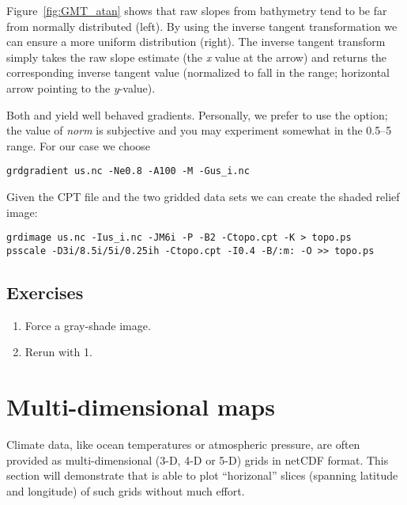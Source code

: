 \documentclass[11pt]{report}
\begin{document}
Figure~\ref{fig:GMT_atan} shows that raw slopes from bathymetry tend to be
far from normally distributed (left).  By using the inverse tangent
transformation we can ensure a more uniform distribution (right).
The inverse tangent transform simply takes the raw slope estimate
(the \emph{x} value at the arrow) and returns the corresponding inverse
tangent value (normalized to fall in the  range; horizontal
arrow pointing to the \emph{y}-value).


Both  and  yield well behaved gradients.  Personally,
we prefer to use the  option; the value of
\emph{norm} is subjective and you may experiment somewhat in the
0.5--5 range.  For our case we choose

{\small\begin{verbatim}
grdgradient us.nc -Ne0.8 -A100 -M -Gus_i.nc
\end{verbatim}
}

Given the CPT file and the two gridded data sets we can
create the shaded relief image:

{\small\begin{verbatim}
grdimage us.nc -Ius_i.nc -JM6i -P -B2 -Ctopo.cpt -K > topo.ps
psscale -D3i/8.5i/5i/0.25ih -Ctopo.cpt -I0.4 -B/:m: -O >> topo.ps
\end{verbatim}
}

\subsection{Exercises}

\begin{enumerate}

\item Force a gray-shade image.

\item Rerun  with 1.

\end{enumerate}

\section{Multi-dimensional maps}

Climate data, like ocean temperatures or atmospheric pressure, are often provided as
multi-dimensional (3-D, 4-D or 5-D) grids in netCDF format. This section will demonstrate
that \GMT{} is able to plot ``horizonal''
slices (spanning latitude and longitude) of such grids without much effort.
\end{document}
